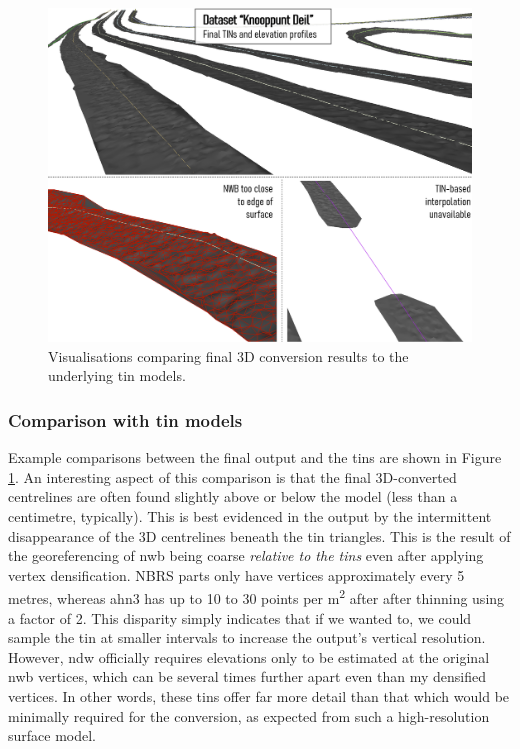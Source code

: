 \begin{figure}[h]
    \centering
    \includegraphics[width=0.9\linewidth]{final_report/figs/elevationinterpolation1.png}
    \caption{Visualisations comparing final 3D conversion results to the underlying \ac{tin} models.}
    \label{fig:elevationinterpolation1}
\end{figure}

\subsubsection{Comparison with \ac{tin} models}

Example comparisons between the final output and the \ac{tin}s are shown in Figure \ref{fig:elevationinterpolation1}. An interesting aspect of this comparison is that the final 3D-converted centrelines are often found slightly above or below the model (less than a centimetre, typically). This is best evidenced in the output by the intermittent disappearance of the 3D centrelines beneath the \ac{tin} triangles. This is the result of the georeferencing of \ac{nwb} being coarse \textit{relative to the \ac{tin}s} even after applying vertex densification. NBRS parts only have vertices approximately every 5 metres, whereas \ac{ahn3} has up to 10 to 30 points per m\textsuperscript{2} after after thinning using a factor of 2. This disparity simply indicates that if we wanted to, we could sample the \ac{tin} at smaller intervals to increase the output's vertical resolution. However, \ac{ndw} officially requires elevations only to be estimated at the original \ac{nwb} vertices, which can be several times further apart even than my densified vertices. In other words, these \ac{tin}s offer far more detail than that which would be minimally required for the conversion, as expected from such a high-resolution surface model.

